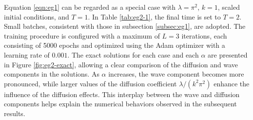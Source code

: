 \documentclass[preprint,3p,times]{elsarticle}
\begin{document}
Equation \eqref{eqn:eg1} can be regarded as a special case with $\lambda = \pi^2$, $k=1$, scaled initial conditions, and $T=1$. In Table \ref{tab:eg2-1}, the final time is set to $T=2$. Small batches, consistent with those in subsection \ref{subsec:eg1}, are adopted. The training procedure is configured with a maximum of  $L=3$ iterations, each consisting of 5000 epochs and optimized using the Adam optimizer with a learning rate of  $0.001$. The exact solutions for each case and each $\alpha$ are presented in Figure \ref{fig:eg2-exact}, allowing a clear comparison of the diffusion and wave components in the solutions. As $\alpha$ increases, the wave component becomes more pronounced, while larger values of the diffusion coefficient $\lambda/(k^2\pi^2)$ enhance the influence of the diffusion effects. This interplay between the wave and diffusion components helps explain the numerical behaviors observed in the subsequent results.
\end{document}
